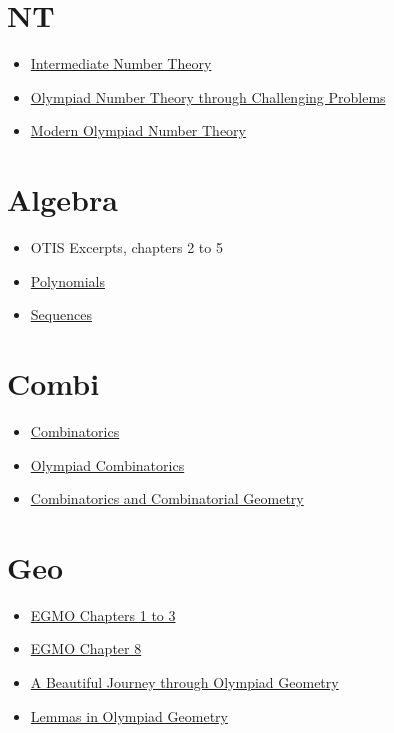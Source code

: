 \documentclass{amsart}
\begin{document}
\section{NT}
\begin{itemize}
  \item
    \href{https://numbertheoryguydotcom.files.wordpress.com/2018/10/main1.pdf}
    {Intermediate Number Theory}
  \item
    \href{http://s3.amazonaws.com/aops-cdn.artofproblemsolving.com/resources/articles/olympiad-number-theory.pdf}
      {Olympiad Number Theory through Challenging Problems}
  \item \href{https://drive.google.com/file/d/1BcJTLjQaelZ4w_70oHKyImC2I8zLfyrt/view?usp=sharing}
    {Modern Olympiad Number Theory}
\end{itemize}

\section{Algebra}
\begin{itemize}
  \item OTIS Excerpts, chapters 2 to 5
  \item
    \href{https://alexanderrem.weebly.com/uploads/7/2/5/6/72566533/polynomials.pdf}
    {Polynomials}
  \item
    \href{https://alexanderrem.weebly.com/uploads/7/2/5/6/72566533/sequences.pdf}
    {Sequences}
\end{itemize}

\section{Combi}
\begin{itemize}
  \item \href{http://math.sun.ac.za/swagner/Combinatorics.pdf}{Combinatorics}
  \item
    \href{https://drive.google.com/file/d/1sQtirXxkEfWYuGSKDZ-d7VGYkR_idebY/view}
    {Olympiad Combinatorics}
  \item
    \href{https://drive.google.com/file/d/1pkgUjWs4ArL9Huq712NO1RtuAvXjr3d9/view?usp=sharing}
    {Combinatorics and Combinatorial Geometry}
\end{itemize}

\section{Geo}
\begin{itemize}
  \item
    \href{https://books.google.com/books?id=47UaDAAAQBAJ&lpg=PP1&pg=PP1#v=onepage&q&f=false}
    {EGMO Chapters 1 to 3}
  \item
    \href{https://www.maa.org/sites/default/files/pdf/ebooks/pdf/EGMO_chapter8.pdf}
    {EGMO Chapter 8}
  \item \href{https://www.olympiadgeometry.com/the-book.html} {A Beautiful
      Journey through Olympiad Geometry}
  \item \href{https://yufeizhao.com/olympiad/geolemmas.pdf} {Lemmas in Olympiad
      Geometry}
\end{itemize}
\end{document}
